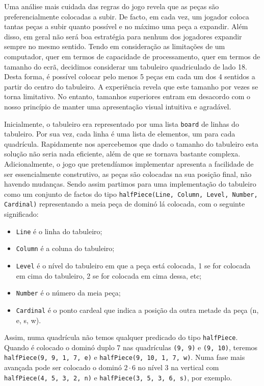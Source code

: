 \documentclass[a4paper]{article}
\begin{document}
Uma análise mais cuidada das regras do jogo revela que as peças são preferencialmente colocadas a subir. De facto, em cada vez, um jogador coloca tantas peças a subir quanto possível e no máximo uma peça a expandir. Além disso, em geral não será boa estratégia para nenhum dos jogadores expandir sempre no mesmo sentido. Tendo em consideração as limitações de um computador, quer em termos de capacidade de processamento, quer em termos de tamanho do ecrã, decidimos considerar um tabuleiro quadriculado de lado 18. Desta forma, é possível colocar pelo menos 5 peças em cada um dos 4 sentidos a partir do centro do tabuleiro. A experiência revela que este tamanho por vezes se torna limitativo. No entanto, tamanhos superiores entram em desacordo com o nosso princípio de manter uma apresentação visual intuitiva e agradável.

Inicialmente, o tabuleiro era representado por uma lista \verb|board| de linhas do tabuleiro. Por sua vez, cada linha é uma lista de elementos, um para cada quadrícula. Rapidamente nos apercebemos que dado o tamanho do tabuleiro esta solução não seria nada eficiente, além de que se tornava bastante complexa. Adicionalmente, o jogo que pretendíamos implementar apresenta a facilidade de ser essencialmente construtivo, as peças são colocadas na sua posição final, não havendo mudanças. Sendo assim partimos para uma implementação do tabuleiro como um conjunto de factos do tipo \verb|halfPiece(Line, Column, Level, Number, Cardinal)| representando a meia peça de dominó lá colocada, com o seguinte significado:
\begin{itemize}
	\item \verb|Line| é o linha do tabuleiro;
	\item \verb|Column| é a coluna do tabuleiro;
	\item \verb|Level| é o nível do tabuleiro em que a peça está colocada, 1 se for colocada em cima do tabuleiro, 2 se for colocada em cima dessa, etc;
	\item \verb|Number| é o número da meia peça;
	\item \verb|Cardinal| é o ponto cardeal que indica a posição da outra metade da peça (n, e, s, w).
\end{itemize}
Assim, numa quadrícula não temos qualquer predicado do tipo \verb|halfPiece|. Quando é colocado o dominó duplo 7 nas quadrículas \verb|(9, 9)| e \verb|(9, 10)|, teremos \verb|halfPiece(9, 9, 1, 7, e)| e \verb|halfPiece(9, 10, 1, 7, w)|. Numa fase mais avançada pode ser colocado o dominó $2 \cdot 6$ no nível 3 na vertical com \verb|halfPiece(4, 5, 3, 2, n)| e \verb|halfPiece(3, 5, 3, 6, s)|, por exemplo.
\end{document}
